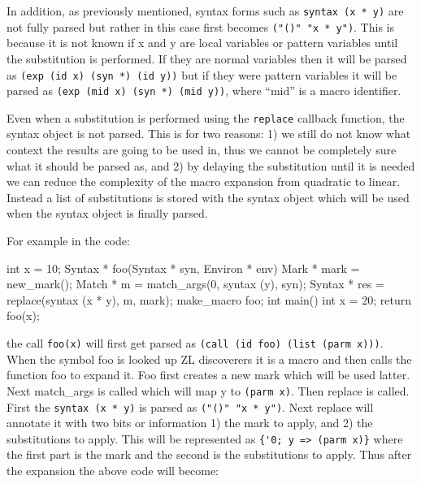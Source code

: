 \documentclass[12pt,english,letterpaper]{article}
\begin{document}
In addition, as previously mentioned, syntax forms such as
\verb/syntax (x * y)/ are not fully parsed but rather in this case
first becomes \verb/("()" "x * y")/.  This is because it is not known
if x and y are local variables or pattern variables until the
substitution is performed.  If they are normal variables then it
will be parsed as \verb/(exp (id x) (syn *) (id y))/ but if they were
pattern variables it will be parsed as
\verb/(exp (mid x) (syn *) (mid y))/, where ``mid'' is a macro
identifier.

Even when a substitution is performed using the \verb/replace/ callback
function, the syntax object is not parsed.  This is for two reasons: 1)
we still do not know what context the results are going to be used in,
thus we cannot be completely sure what it should be
parsed as, and 2) by delaying the substitution until it is needed we
can reduce the complexity of the macro expansion from quadratic to
linear.  Instead a list of substitutions is stored with the syntax
object which will be used when the syntax object is finally parsed.

For example in the code:

\begin{code}
int x = 10;
Syntax * foo(Syntax * syn, Environ * env) {
  Mark * mark = new_mark();
  Match * m = match_args(0, syntax (y), syn);
  Syntax * res = replace(syntax (x * y), m, mark);
}
make_macro foo;
int main() {
  int x = 20;
  return foo(x);
}
\end{code}

the call \verb/foo(x)/ will first get parsed as
\verb/(call (id foo) (list (parm x)))/.  When the symbol foo is looked
up ZL discoverers it is a macro and then calls the function foo to
expand it.  Foo first creates a new mark which will be used latter.
Next match\_args is called which will map y to \verb/(parm x)/.  Then
replace is called.  First the \verb/syntax (x * y)/ is parsed as
\verb/("()" "x * y")/. Next replace will annotate it with two bits
or information 1) the mark to apply, and 2) the substitutions to apply.
This will be represented as \verb/{'0; y => (parm x)}/
where the first part is the mark and the second is the substitutions to
apply.  Thus after the expansion the above code will become:

\end{document}
